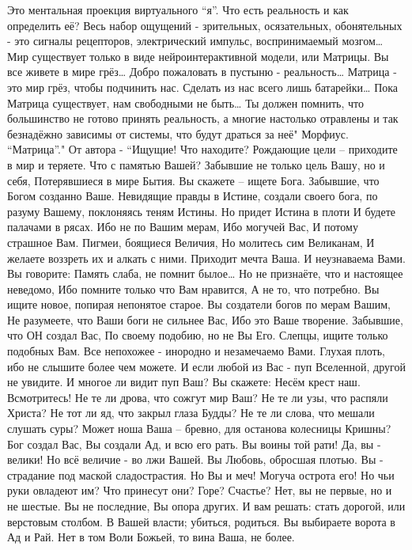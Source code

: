  Это ментальная проекция виртуального ``я''. Что есть реальность и как определить её? Весь набор ощущений - зрительных, осязательных, обонятельных - это сигналы рецепторов, электрический импульс, воспринимаемый мозгом… Мир существует только в виде нейроинтерактивной модели, или Матрицы. Вы все живете в мире грёз…
 Добро пожаловать в пустыню - реальность… Матрица - это мир грёз, чтобы подчинить нас. Сделать из нас всего лишь батарейки… Пока Матрица существует, нам свободными не быть… Ты должен помнить, что большинство не готово принять реальность, а многие настолько отравлены и так безнадёжно зависимы от системы, что будут драться за неё"
 Морфиус. ``Матрица''."
От автора - ``Ищущие! Что находите? 
Рождающие цели – приходите в мир и теряете. 
Что с памятью Вашей? 
Забывшие не только цель Вашу, но и себя, 
Потерявшиеся в мире Бытия. 
Вы скажете – ищете Бога. 
Забывшие, что Богом созданно Ваше. 
Невидящие правды в Истине, 
создали своего бога, по разуму Вашему, 
поклоняясь теням Истины. 
Но придет Истина в плоти 
И будете палачами в рясах. 
Ибо не по Вашим мерам, 
Ибо могучей Вас, 
И потому страшное Вам. 
Пигмеи, боящиеся Величия, 
Но молитесь сим Великанам, 
И желаете воззреть их и алкать с ними. 
Приходит мечта Ваша. 
И неузнаваема Вами. 
Вы говорите: Память слаба, не помнит былое… 
Но не признаёте, что и настоящее неведомо, 
Ибо помните только что Вам нравится, 
А не то, что потребно. 
Вы ищите новое, попирая непонятое старое. 
Вы создатели богов по мерам Вашим, 
Не разумеете, что Ваши боги не сильнее Вас, 
Ибо это Ваше творение. 
Забывшие, что ОН создал Вас, 
По своему подобию, но не Вы Его. 
Слепцы, ищите только подобных Вам. 
Все непохожее - инородно и незамечаемо Вами. 
Глухая плоть, ибо не слышите более чем можете. 
И если любой из Вас - пуп Вселенной, 
другой не увидите. 
И многое ли видит пуп Ваш? 
Вы скажете: Несём крест наш. 
Всмотритесь! 
Не те ли дрова, что сожгут мир Ваш? 
Не те ли узы, что распяли Христа? 
Не тот ли яд, что закрыл глаза Будды? 
Не те ли слова, что мешали слушать суры? 
Может ноша Ваша – бревно, 
для останова колесницы Кришны? 
Бог создал Вас, 
Вы создали Ад, и всю его рать. 
Вы воины той рати! 
Да, вы - велики! 
Но всё величие - во лжи Вашей. 
Вы Любовь, обросшая плотью. 
Вы - страдание под маской сладострастия.
Но Вы и меч! 
Могуча острота его! 
Но чьи руки овладеют им? 
Что принесут они? 
Горе? Счастье? 
Нет, вы не первые, но и не шестые. 
Вы не последние, Вы опора других. 
 И вам решать: стать дорогой, или верстовым столбом. 
В Вашей власти; убиться, родиться. 
Вы выбираете ворота в Ад и Рай. 
Нет в том Воли Божьей, 
то вина Ваша, не более. 
